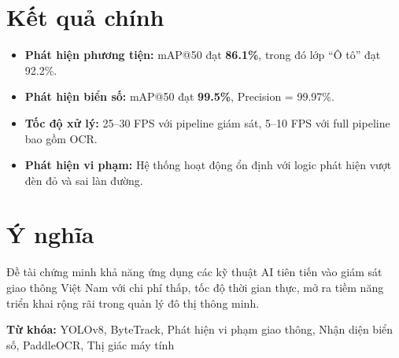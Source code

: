 \section*{Kết quả chính}
\begin{itemize}
    \item \textbf{Phát hiện phương tiện:} mAP@50 đạt \textbf{86.1\%}, trong đó lớp ``Ô tô'' đạt 92.2\%.
    \item \textbf{Phát hiện biển số:} mAP@50 đạt \textbf{99.5\%}, Precision = 99.97\%.
    \item \textbf{Tốc độ xử lý:} 25--30 FPS với pipeline giám sát, 5--10 FPS với full pipeline bao gồm OCR.
    \item \textbf{Phát hiện vi phạm:} Hệ thống hoạt động ổn định với logic phát hiện vượt đèn đỏ và sai làn đường.
\end{itemize}

\section*{Ý nghĩa}
Đề tài chứng minh khả năng ứng dụng các kỹ thuật AI tiên tiến vào giám sát giao thông Việt Nam với chi phí thấp, tốc độ thời gian thực, mở ra tiềm năng triển khai rộng rãi trong quản lý đô thị thông minh.

\vspace{0.5cm}
\textbf{Từ khóa:} YOLOv8, ByteTrack, Phát hiện vi phạm giao thông, Nhận diện biển số, PaddleOCR, Thị giác máy tính
